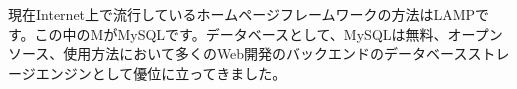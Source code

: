 現在Internet上で流行しているホームページフレームワークの方法はLAMPです。この中のMがMySQLです。データベースとして、MySQLは無料、オープンソース、使用方法において多くのWeb開発のバックエンドのデータベースストレージエンジンとして優位に立ってきました。
